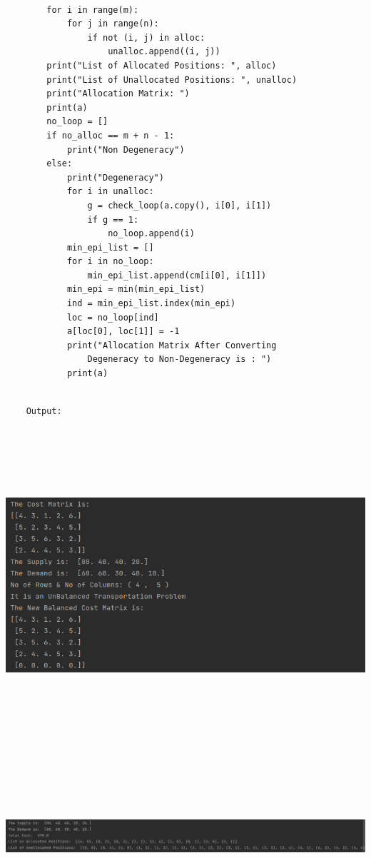 \documentclass[12pt, letterpaper, twoside]{book}
\begin{document}
\begin{lstlisting}
		
		for i in range(m):
			for j in range(n):
				if not (i, j) in alloc:
					unalloc.append((i, j))
		print("List of Allocated Positions: ", alloc)
		print("List of Unallocated Positions: ", unalloc)
		print("Allocation Matrix: ")
		print(a)
		no_loop = []
		if no_alloc == m + n - 1:
			print("Non Degeneracy")
		else:
			print("Degeneracy")
			for i in unalloc:
				g = check_loop(a.copy(), i[0], i[1])
				if g == 1:
					no_loop.append(i)
			min_epi_list = []
			for i in no_loop:
				min_epi_list.append(cm[i[0], i[1]])
			min_epi = min(min_epi_list)
			ind = min_epi_list.index(min_epi)
			loc = no_loop[ind]
			a[loc[0], loc[1]] = -1
			print("Allocation Matrix After Converting 
				Degeneracy to Non-Degeneracy is : ")
			print(a)

\end{lstlisting}
\pagebreak
\begin{lstlisting}
	
	Output:
	
\end{lstlisting}

\includegraphics[height=300pt,width=550pt]{Output2}

\includegraphics[height=200pt,width=550pt]{Output3}
\end{document}
